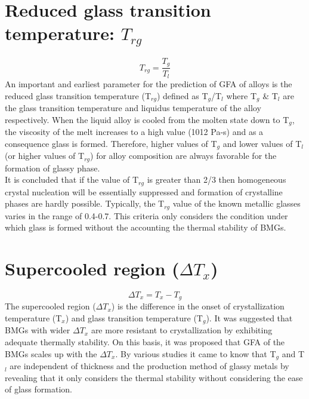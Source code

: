 \section{Reduced glass transition temperature: $
T_{rg}$ }
$$
T_{rg} = \frac{T_g}{T_l}
$$ 
An important and earliest parameter for the prediction of GFA of alloys is the reduced glass transition temperature (T$_{rg}$) defined as T$_g$/T$_l$ where T$_g$ \& T$_l$ are the glass transition temperature and liquidus temperature of the alloy respectively. When the liquid alloy is cooled from the molten state down to T$_g$, the viscosity of the melt increases to a high value (1012 Pa-s) and as a consequence glass is formed. Therefore, higher values of T$_g$ and lower values of T$_l$ (or higher values of T$_{rg}$) for alloy composition are always favorable for the formation of glassy phase. 
\\
It is concluded that if the value of T$_{rg}$ is greater than 2/3 then homogeneous crystal nucleation will be essentially suppressed and formation of crystalline phases are hardly possible. Typically, the T$_{rg}$ value of the known metallic glasses varies in the range of 0.4-0.7. This criteria only considers the condition under which glass is formed without the accounting the thermal stability of BMGs. 
\section{Supercooled region ($\Delta T_x$)}
$$ \Delta T_x= T_x-T_g$$
The supercooled region ($\Delta T_x$) is the difference in the onset of crystallization temperature (T$_x$) and glass transition temperature (T$_g$). It was suggested that BMGs with wider $\Delta T_x$ are more resistant to crystallization by exhibiting adequate thermally stability. On this basis, it was proposed that GFA of the BMGs scales up with the $\Delta T_x$. By various studies it came to know that T$_g$ and T$_l$ are independent of thickness and the production method of glassy metals by revealing that it only considers the thermal stability without considering the ease of glass formation.\\
